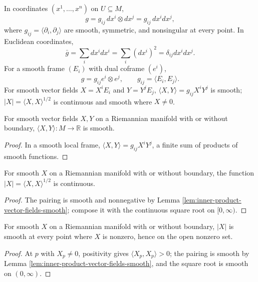 In coordinates $(x^1,\ldots,x^n)$ on $U\subseteq M$,
\[
g=g_{ij}\,dx^i\otimes dx^j=g_{ij}\,dx^i dx^j,\tag{2.7}
\]
where $g_{ij}=\langle\partial_i,\partial_j\rangle$ are smooth, symmetric, and nonsingular at every point. In Euclidean coordinates,
\[
\bar g=\sum_i dx^i dx^i=\sum_i(dx^i)^2=\delta_{ij}dx^i dx^j.\tag{2.8}
\]
For a smooth frame $(E_i)$ with dual coframe $(e^i)$,
\[
g=g_{ij}e^i\otimes e^j,\qquad g_{ij}=\langle E_i,E_j\rangle.\tag{2.9}
\]
For smooth vector fields $X=X^iE_i$ and $Y=Y^jE_j$, $\langle X,Y\rangle=g_{ij}X^iY^j$ is smooth; $|X|=\langle X,X\rangle^{1/2}$ is continuous and smooth where $X\ne0$.

\begin{lemma}
\label{lem:inner-product-vector-fields-smooth}





For smooth vector fields $X,Y$ on a Riemannian manifold with or without boundary, $\langle X,Y\rangle:M\to\mathbb R$ is smooth.
\end{lemma}
\begin{proof}

\sketch In a smooth local frame, $\langle X,Y\rangle=g_{ij}X^iY^j$, a finite sum of products of smooth functions.
\end{proof}

\begin{lemma}
\label{lem:length-vector-field-continuous}





For smooth $X$ on a Riemannian manifold with or without boundary, the function $|X|=\langle X,X\rangle^{1/2}$ is continuous.
\end{lemma}
\begin{proof}

\sketch The pairing is smooth and nonnegative by Lemma \ref{lem:inner-product-vector-fields-smooth}; compose it with the continuous square root on $[0,\infty)$.
\end{proof}

\begin{lemma}
\label{lem:length-vector-field-smooth}





For smooth $X$ on a Riemannian manifold with or without boundary, $|X|$ is smooth at every point where $X$ is nonzero, hence on the open nonzero set.
\end{lemma}
\begin{proof}

\sketch At $p$ with $X_p\ne0$, positivity gives $\langle X_p,X_p\rangle>0$; the pairing is smooth by Lemma \ref{lem:inner-product-vector-fields-smooth}, and the square root is smooth on $(0,\infty)$.
\end{proof}

